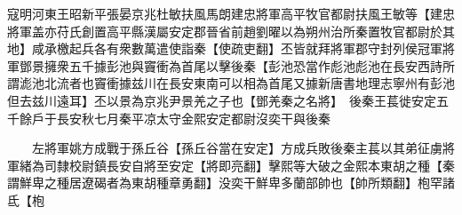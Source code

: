 寇明河東王昭新平張晏京兆杜敏扶風馬朗建忠將軍高平牧官都尉扶風王敏等【建忠將軍盖亦苻氏創置高平縣漢屬安定郡晉省前趙劉曜以為朔州治所秦置牧官都尉於其地】咸承檄起兵各有衆數萬遣使詣秦【使疏吏翻】丕皆就拜將軍郡守封列侯冠軍將軍鄧景擁衆五千據彭池與竇衝為首尾以擊後秦【彭池恐當作彪池彪池在長安西詩所謂滮池北流者也竇衝據兹川在長安東南可以相為首尾又據新唐書地理志寧州有彭池但去兹川遠耳】丕以景為京兆尹景羌之子也【鄧羌秦之名將】　後秦王萇徙安定五千餘戶于長安秋七月秦平凉太守金熙安定都尉沒奕干與後秦

　　左將軍姚方成戰于孫丘谷【孫丘谷當在安定】方成兵敗後秦主萇以其弟征虜將軍緒為司隸校尉鎮長安自將至安定【將即亮翻】擊熙等大破之金熙本東胡之種【秦謂鮮卑之種居遼碣者為東胡種章勇翻】没奕干鮮卑多蘭部帥也【帥所類翻】枹罕諸氐【枹